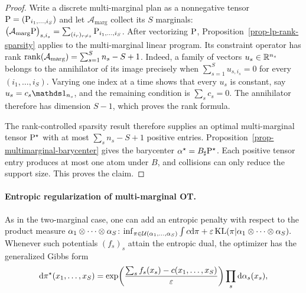 \begin{proof}
Write a discrete multi-marginal plan as a nonnegative tensor
$\P=(\P_{i_1,\ldots,i_S})$ and let $\mathcal A_{\mathrm{marg}}$ collect its $S$ marginals:
$\bigl(\mathcal A_{\mathrm{marg}}\P\bigr)_{s,i_s} = \sum_{(i_r)_{r\neq s}}\P_{i_1,\ldots,i_S}$.
After vectorizing $\P$, Proposition~\ref{prop-lp-rank-sparsity} applies to the multi-marginal linear program. Its constraint operator has rank
$\rank(\mathcal A_{\mathrm{marg}}) = \sum_{s=1}^S n_s-S+1$.
Indeed, a family of vectors $u_s\in\RR^{n_s}$ belongs to the annihilator of its image precisely when
$\sum_{s=1}^S u_{s,i_s}=0$ for every $(i_1,\ldots,i_S)$.
Varying one index at a time shows that every $u_s$ is constant, say $u_s=c_s\ones_{n_s}$, and the remaining condition is $\sum_s c_s=0$. The annihilator therefore has dimension $S-1$, which proves the rank formula.

The rank-controlled sparsity result therefore supplies an optimal multi-marginal tensor $\P^\star$ with at most $\sum_s n_s-S+1$ positive entries. Proposition~\ref{prop-multimarginal-barycenter} gives the barycenter $\al^\star=B_\sharp\P^\star$. Each positive tensor entry produces at most one atom under $B$, and collisions can only reduce the support size. This proves the claim.
\end{proof}
\paragraph{Entropic regularization of multi-marginal OT.}
As in the two-marginal case, one can add an entropic penalty with respect to the product measure $\al_1\otimes\cdots\otimes\al_S$:
\(\inf_{\pi\in\Couplings(\al_1,\ldots,\al_S)} \int c\d\pi+\epsilon\KL(\pi|\al_1\otimes\cdots\otimes\al_S).\)
Whenever such potentials $(f_s)_s$ attain the entropic dual, the optimizer has the generalized Gibbs form
\[
\d\pi^\star(x_1,\ldots,x_S)
=
\exp\!\left(\frac{\sum_s f_s(x_s)-c(x_1,\ldots,x_S)}{\epsilon}\right)
\prod_s\d\al_s(x_s),
\]
